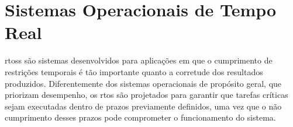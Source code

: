 \section{Sistemas Operacionais de Tempo Real}

\Glspl{rtos} são sistemas desenvolvidos para aplicações em que o cumprimento de restrições temporais é tão importante quanto a corretude dos resultados produzidos.
Diferentemente dos sistemas operacionais de propósito geral, que priorizam desempenho, os \gls{rtos} são projetados para garantir que tarefas críticas
sejam executadas dentro de prazos previamente definidos, uma vez que o não cumprimento desses prazos pode comprometer o funcionamento do sistema.

